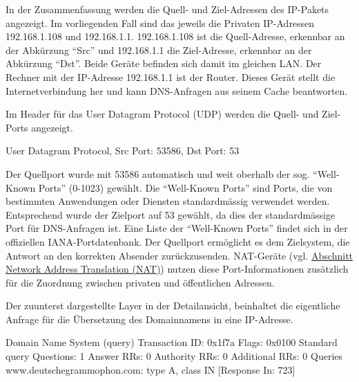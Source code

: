 \documentclass[
  nswissgerman,
  a4paper,
  DIV=11,
  numbers=noendperiod,
  ngerman]{scrreprt}
\newenvironment{Shaded}{\begin{snugshade}}{\end{snugshade}}
\newcommand{\NormalTok}[1]{\textcolor[rgb]{0.00,0.23,0.31}{#1}}
\begin{document}
In der Zusammenfassung werden die Quell- und Ziel-Adressen des IP-Pakets
angezeigt. Im vorliegenden Fall sind das jeweils die Privaten
IP-Adressen 192.168.1.108 und 192.168.1.1. 192.168.1.108 ist die
Quell-Adresse, erkennbar an der Abkürzung ``Src'' und 192.168.1.1 die
Ziel-Adresse, erkennbar an der Abkürzung ``Dst''. Beide Geräte befinden
sich damit im gleichen LAN. Der Rechner mit der IP-Adresse 192.168.1.1
ist der Router. Dieses Gerät stellt die Internetverbindung her und kann
DNS-Anfragen aus seinem Cache beantworten.

Im Header für das User Datagram Protocol (UDP) werden die Quell- und
Ziel-Ports angezeigt.

\begin{Shaded}
\begin{Highlighting}[numbers=left,,]
\NormalTok{User Datagram Protocol, Src Port: 53586, Dst Port: 53}
\end{Highlighting}
\end{Shaded}

Der Quellport wurde mit 53586 automatisch und weit oberhalb der sog.
``Well-Known Ports'' (0-1023) gewählt. Die ``Well-Known Ports'' sind
Ports, die von bestimmten Anwendungen oder Diensten standardmässig
verwendet werden. Entsprechend wurde der Zielport auf 53 gewählt, da
dies der standardmässige Port für DNS-Anfragen ist. Eine Liste der
``Well-Known Ports'' findet sich in der offiziellen IANA-Portdatenbank.
Der Quellport ermöglicht es dem Zielsystem, die Antwort an den korrekten
Absender zurückzusenden. NAT-Geräte (vgl.
\hyperref[network-address-translation-nat]{Abschnitt Network Address
Translation (NAT)}) nutzen diese Port-Informationen zusätzlich für die
Zuordnung zwischen privaten und öffentlichen Adressen.

Der zuunterst dargestellte Layer in der Detailansicht, beinhaltet die
eigentliche Anfrage für die Übersetzung des Domainnamens in eine
IP-Adresse.

\begin{Shaded}
\begin{Highlighting}[numbers=left,,]
\NormalTok{Domain Name System (query)}
\NormalTok{    Transaction ID: 0x1f7a}
\NormalTok{    Flags: 0x0100 Standard query}
\NormalTok{    Questions: 1}
\NormalTok{    Answer RRs: 0}
\NormalTok{    Authority RRs: 0}
\NormalTok{    Additional RRs: 0}
\NormalTok{    Queries}
\NormalTok{        www.deutschegrammophon.com: type A, class IN}
\NormalTok{    [Response In: 723]}
\end{Highlighting}
\end{Shaded}
\end{document}
